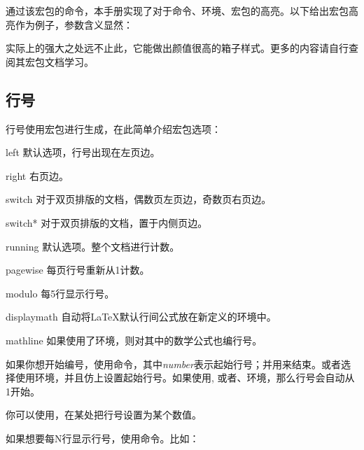 \mbox{}

通过该宏包的命令，本手册实现了对于命令、环境、宏包的高亮。以下给出宏包高亮作为例子，参数含义显然：

实际上的强大之处远不止此，它能做出颜值很高的箱子样式。更多的内容请自行查阅其宏包文档学习。

\subsection{行号}
\begin{linenumbers}
\modulolinenumbers[3]
行号使用宏包进行生成，在此简单介绍宏包选项：
\begin{para}
  \item[left]默认选项，行号出现在左页边。
  \item[right]右页边。
  \item[switch]对于双页排版的文档，偶数页左页边，奇数页右页边。
  \item[switch*]对于双页排版的文档，置于内侧页边。
  \item[running]默认选项。整个文档进行计数。
  \item[pagewise]每页行号重新从1计数。
  \item[modulo]每5行显示行号。
  \item[displaymath]自动将\LaTeX 默认行间公式放在新定义的环境中。
  \item[mathline]如果使用了环境，则对其中的数学公式也编行号。
\end{para}

如果你想开始编号，使用命令，其中\textit{number}表示起始行号；并用来结束。或者选择使用环境，并且仿上设置起始行号。如果使用, 或者、环境，那么行号会自动从1开始。

你可以使用，在某处把行号设置为某个数值。

如果想要每N行显示行号，使用命令。比如：
\end{linenumbers}

